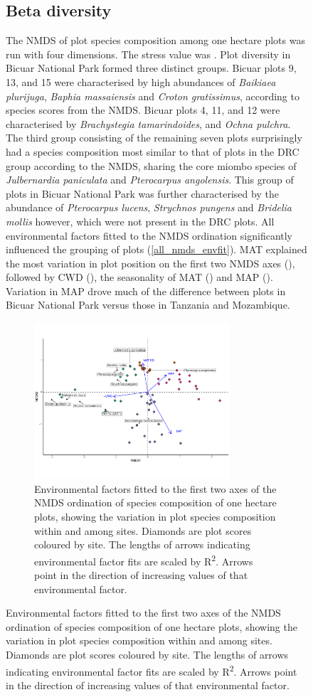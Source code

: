\documentclass[diversity,article,submit,moreauthors,pdftex]{Definitions/mdpi}
\begin{document}
\begin{figure}[H]
\subsection{Beta diversity}

The NMDS of plot species composition among one hectare plots was run with four dimensions. The stress value was \nmdsstress{}. Plot diversity in Bicuar National Park formed three distinct groups. Bicuar plots 9, 13, and 15 were characterised by high abundances of \textit{Baikiaea plurijuga}, \textit{Baphia massaiensis} and \textit{Croton gratissimus}, according to species scores from the NMDS. Bicuar plots 4, 11, and 12 were characterised  by \textit{Brachystegia tamarindoides}, and \textit{Ochna pulchra}. The third group consisting of the remaining seven plots surprisingly had a species composition most similar to that of plots in the DRC group according to the NMDS, sharing the core miombo species of \textit{Julbernardia paniculata} and \textit{Pterocarpus angolensis}. This group of plots in Bicuar National Park was further characterised by the abundance of \textit{Pterocarpus lucens}, \textit{Strychnos pungens} and \textit{Bridelia mollis} however, which were not present in the DRC plots. All environmental factors fitted to the NMDS ordination significantly influenced the grouping of plots (\autoref{all_nmds_envfit}). MAT explained the most variation in plot position on the first two NMDS axes (\nmdsmat{}), followed by CWD (\nmdsmapsd{}), the seasonality of MAT (\nmdsmatsd{}) and MAP (\nmdsmap{}). Variation in MAP drove much of the difference between plots in Bicuar National Park versus those in Tanzania and Mozambique. 

\begin{figure}[H]
\centering
	\includegraphics[width=0.8\textwidth]{img/all_nmds_envfit}
	\caption{Environmental factors fitted to the first two axes of the NMDS ordination of species composition of one hectare plots, showing the variation in plot species composition within and among sites. Diamonds are plot scores coloured by site. The lengths of arrows indicating environmental factor fits are scaled by R\textsuperscript{2}. Arrows point in the direction of increasing values of that environmental factor.}
	\label{all_nmds_envfit}
\end{figure}


\end{figure}
\end{document}
